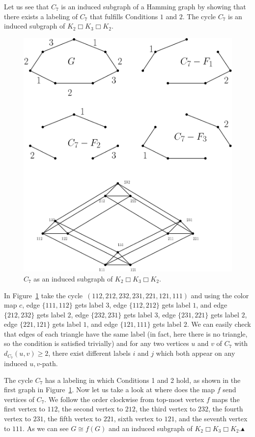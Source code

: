 \documentclass[12pt,a4paper,titlepage,openany]{report}
\begin{document}
\begin{example}
Let us see that $C_7$ is an induced subgraph of a Hamming graph by showing that there exists a labeling of $C_7$ that fulfills Conditions $1$ and $2$. The cycle $C_7$ is an induced subgraph of $K_2 \Box K_3 \Box K_2$.

\begin{figure}[h!]
\begin{center}
\includegraphics[width=0.8\linewidth]{figures/c_7inducedhamming.png}
\end{center}
\caption{$C_7$ as an induced subgraph of $K_2 \Box K_3 \Box K_2$.}\label{fig:c7induced}
\end{figure}

In Figure~\ref{fig:c7induced} take the cycle~$(112,212,232,231,221,121,111)$ and using the color map $c$, edge $\{111,112\}$ gets label $3$, edge $\{112,212\}$ gets label $1$, and edge $\{212,232\}$ gets label $2$, edge $\{232,231\}$ gets label $3$, edge $\{231,221\}$ gets label $2$, edge $\{221,121\}$ gets label $1$, and edge $\{121,111\}$ gets label $2$. We can easily check that edges of each triangle have the same label (in fact, here there is no triangle, so the condition is satisfied trivially) and for any two vertices $u$ and $v$ of $C_7$ with $d_{C_7}(u,v) \geq 2$, there exist different labels $i$ and $j$ which both appear on any induced $u, v$-path.

The cycle $C_7$ has a labeling in which Conditions 1 and 2 hold, as shown in the first graph in Figure~\ref{fig:c7induced}. Now let us take a look at where does the map $f$ send vertices of $C_7$. We follow the order clockwise from top-most vertex $f$ maps the first vertex to $112$, the second vertex to $212$, the third vertex to $232$, the fourth vertex to $231$, the fifth vertex to $221$, sixth vertex to $121$, and the seventh vertex to $111$. As we can see $G\cong f(G)$ and an induced subgraph of $K_2 \Box K_3 \Box K_2$.\hfill$\blacktriangle$
\end{example}
\end{document}
